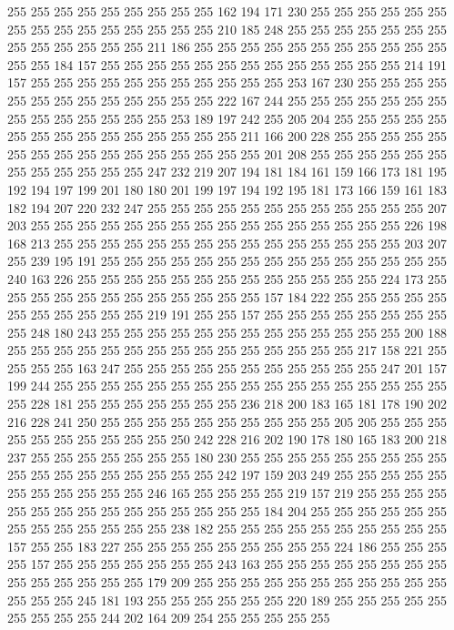 255 255 255 255 255 255 255 255 255 162 194 171 230 255 255 255 255 255 255 255
255 255 255 255 255 255 255 255 210 185 248 255 255 255 255 255 255 255 255 255
255 255 255 255 211 186 255 255 255 255 255 255 255 255 255 255 255 255 255 184
157 255 255 255 255 255 255 255 255 255 255 255 255 255 214 191 157 255 255 255
255 255 255 255 255 255 255 255 253 167 230 255 255 255 255 255 255 255 255 255
255 255 255 255 222 167 244 255 255 255 255 255 255 255 255 255 255 255 255 255
255 253 189 197 242 255 205 204 255 255 255 255 255 255 255 255 255 255 255 255
255 255 255 211 166 200 228 255 255 255 255 255 255 255 255 255 255 255 255 255
255 255 255 201 208 255 255 255 255 255 255 255 255 255 255 255 255 247 232 219
207 194 181 184 161 159 166 173 181 195 192 194 197 199 201 180 180 201 199 197
194 192 195 181 173 166 159 161 183 182 194 207 220 232 247 255 255 255 255 255
255 255 255 255 255 255 255 207 203 255 255 255 255 255 255 255 255 255 255 255
255 255 255 255 255 226 198 168 213 255 255 255 255 255 255 255 255 255 255 255
255 255 255 255 203 207 255 239 195 191 255 255 255 255 255 255 255 255 255 255
255 255 255 255 255 240 163 226 255 255 255 255 255 255 255 255 255 255 255 255
255 224 173 255 255 255 255 255 255 255 255 255 255 255 255 157 184 222 255 255
255 255 255 255 255 255 255 255 255 219 191 255 255 157 255 255 255 255 255 255
255 255 255 248 180 243 255 255 255 255 255 255 255 255 255 255 255 255 255 200
188 255 255 255 255 255 255 255 255 255 255 255 255 255 255 255 217 158 221 255
255 255 255 163 247 255 255 255 255 255 255 255 255 255 255 255 247 201 157 199
244 255 255 255 255 255 255 255 255 255 255 255 255 255 255 255 255 255 255 228
181 255 255 255 255 255 255 255 236 218 200 183 165 181 178 190 202 216 228 241
250 255 255 255 255 255 255 255 255 255 255 205 205 255 255 255 255 255 255 255
255 255 255 250 242 228 216 202 190 178 180 165 183 200 218 237 255 255 255 255
255 255 255 180 230 255 255 255 255 255 255 255 255 255 255 255 255 255 255 255
255 255 255 242 197 159 203 249 255 255 255 255 255 255 255 255 255 255 255 246
165 255 255 255 255 219 157 219 255 255 255 255 255 255 255 255 255 255 255 255
255 255 255 184 204 255 255 255 255 255 255 255 255 255 255 255 255 255 238 182
255 255 255 255 255 255 255 255 255 255 157 255 255 183 227 255 255 255 255 255
255 255 255 255 224 186 255 255 255 255 157 255 255 255 255 255 255 255 243 163
255 255 255 255 255 255 255 255 255 255 255 255 255 255 179 209 255 255 255 255
255 255 255 255 255 255 255 255 255 255 245 181 193 255 255 255 255 255 255 220
189 255 255 255 255 255 255 255 255 255 244 202 164 209 254 255 255 255 255 255
